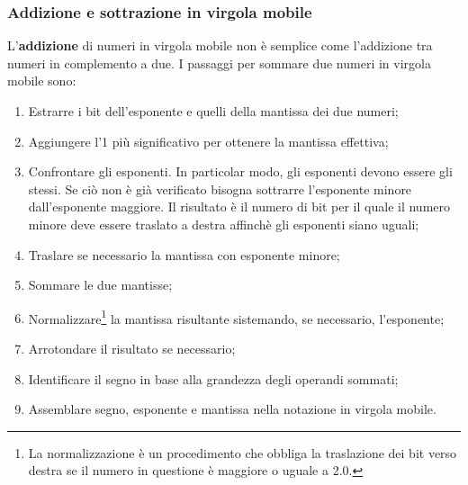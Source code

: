 \subsubsection{Addizione e sottrazione in virgola mobile}
L’\textbf{addizione} di numeri in virgola mobile non è semplice come l’addizione tra numeri in complemento a due. I passaggi per sommare due numeri in virgola mobile sono:
\begin{enumerate}
    \item\label{enum:1} Estrarre i bit dell’esponente e quelli della mantissa dei due numeri;
    \item\label{enum:2} Aggiungere l’1 più significativo per ottenere la mantissa effettiva;
    \item\label{enum:3} Confrontare gli esponenti. In particolar modo, gli esponenti devono essere gli stessi. Se ciò non è già verificato bisogna sottrarre l’esponente minore dall’esponente maggiore. Il risultato è il numero di bit per il quale il numero minore deve essere traslato a destra affinchè gli esponenti siano uguali;
    \item\label{enum:4}Traslare se necessario la mantissa con esponente minore;
    \item\label{enum:5} Sommare le due mantisse;
    \item\label{enum:6} Normalizzare\footnote{La normalizzazione è un procedimento che obbliga la traslazione dei bit verso destra se il numero in questione è maggiore o uguale a 2.0.} la mantissa risultante sistemando, se necessario, l’esponente;
    \item\label{enum:7} Arrotondare il risultato se necessario;
    \item\label{enum:8} Identificare il segno in base alla grandezza degli operandi sommati;
    \item\label{enum:9} Assemblare segno, esponente e mantissa nella notazione in virgola mobile.
\end{enumerate}

